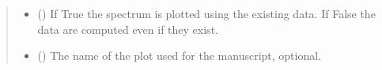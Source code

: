 \documentclass[letterpaper,10pt,english]{sphinxmanual}
\begin{document}
\begin{fulllineitems}
\begin{quote}
\begin{description}
\begin{itemize}
\item {} 
\sphinxAtStartPar
{} () \textendash{} If True the spectrum is plotted using the existing data.
If False the data are computed even if they exist.

\item {} 
\sphinxAtStartPar
{} () \textendash{} The name of the plot used for the manuscript, optional.

\end{itemize}

\end{description}\end{quote}

\end{fulllineitems}

\end{document}
